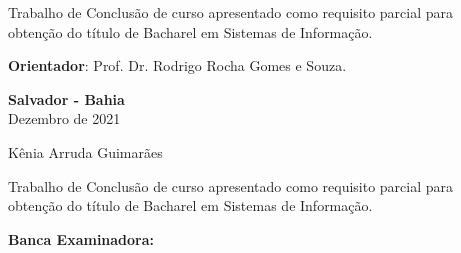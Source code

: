 \documentclass[12pt, a4paper]{report}
\begin{document}
\vspace{4cm}

\begin{flushright}
\begin{minipage}{8.6cm}
Trabalho de Conclusão de curso apresentado como requisito parcial para obtenção do título de Bacharel em Sistemas de Informação.

\vspace{0.5cm}
\textbf{Orientador}: Prof. Dr. Rodrigo Rocha Gomes e Souza.

\end{minipage}
\end{flushright}
 
\vspace{6.95cm}

\begin{center}
\textbf{Salvador - Bahia} \\
Dezembro de 2021
\end{center}
\thispagestyle{empty} 

\newpage
\begin{center}
\vspace{1.3 cm}
\par{}

\vspace{2cm}

\large{Kênia Arruda Guimarães}
\end{center}

\vspace{1.3 cm}

\begin{flushright}
\begin{minipage}{8.6cm} 
Trabalho de Conclusão de curso apresentado como requisito parcial para obtenção do título de Bacharel em Sistemas de Informação.
\end{minipage}
\end{flushright}
 
\vspace{1.5cm}
\begin{center}
\Large \textbf{Banca Examinadora:}
\end{center}
\vspace{1cm}
\end{document}
